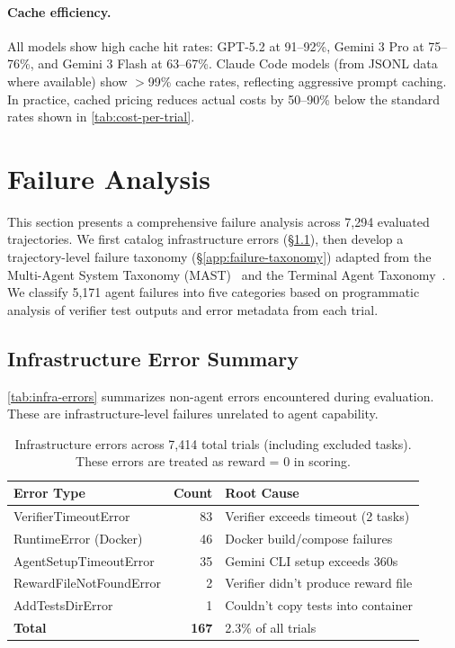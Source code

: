 \paragraph{Cache efficiency.} All models show high cache hit rates: GPT-5.2 at 91--92\%, Gemini 3 Pro at 75--76\%, and Gemini 3 Flash at 63--67\%. Claude Code models (from JSONL data where available) show $>$99\% cache rates, reflecting aggressive prompt caching. In practice, cached pricing reduces actual costs by 50--90\% below the standard rates shown in \autoref{tab:cost-per-trial}.


\section{Failure Analysis}
\label{app:failure-analysis}

This section presents a comprehensive failure analysis across 7,294 evaluated trajectories. We first catalog infrastructure errors (\S\ref{app:infra-errors}), then develop a trajectory-level failure taxonomy (\S\ref{app:failure-taxonomy}) adapted from the Multi-Agent System Taxonomy (MAST)~\citep{pan2025multiagentfail} and the Terminal Agent Taxonomy~\citep{merrill2026terminalbenchbenchmarkingagentshard}. We classify 5,171 agent failures into five categories based on programmatic analysis of verifier test outputs and error metadata from each trial.

\subsection{Infrastructure Error Summary}
\label{app:infra-errors}

\autoref{tab:infra-errors} summarizes non-agent errors encountered during evaluation. These are infrastructure-level failures unrelated to agent capability.

\begin{table}[htb]
\centering
\small
\caption{Infrastructure errors across 7,414 total trials (including excluded tasks). These errors are treated as reward = 0 in scoring.}
\label{tab:infra-errors}
\begin{tabular}{lrl}
\toprule
\textbf{Error Type} & \textbf{Count} & \textbf{Root Cause} \\
\midrule
VerifierTimeoutError & 83 & Verifier exceeds timeout (2 tasks) \\
RuntimeError (Docker) & 46 & Docker build/compose failures \\
AgentSetupTimeoutError & 35 & Gemini CLI setup exceeds 360s \\
RewardFileNotFoundError & 2 & Verifier didn't produce reward file \\
AddTestsDirError & 1 & Couldn't copy tests into container \\
\midrule
\textbf{Total} & \textbf{167} & 2.3\% of all trials \\
\bottomrule
\end{tabular}
\end{table}

